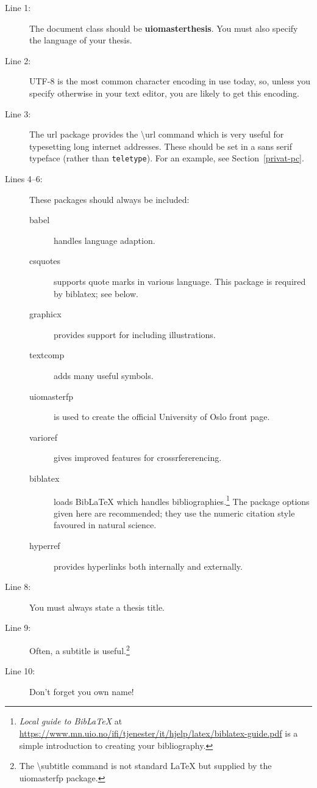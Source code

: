 \documentclass[UKenglish]{uiomasterthesis}
\newcommand{\bsl}{\textbackslash}
\newcommand{\p}[1]{\textsf{#1}}
\newcommand{\pb}[1]{\textbf{\p{#1}}}
\newcommand{\pcmd}[1]{\p{\bsl #1}}
\begin{document}
\begin{description}
\item[Line 1:] The document class should be \pb{uiomasterthesis}. You must
  also specify the language of your thesis.
\item[Line 2:] UTF-8 is the most common character encoding in use
  today, so, unless you specify otherwise in your text editor, you are
  likely to get this encoding.
\item[Line 3:] The \p{url} package provides the \pcmd{url}
  command which is very useful for typesetting long internet
  addresses. These should be set in a \textsf{sans serif} typeface
  (rather than \texttt{teletype}). For an example, see
  Section~\vref{privat-pc}.
\item[Lines 4--6:] These packages should always be included:
  \begin{description}
  \item[\p{babel}] handles language adaption.
  \item[\p{csquotes}] supports quote marks in various language. This
    package is required by \p{biblatex}; see below.
  \item[\p{graphicx}] provides support for including illustrations.
  \item[\p{textcomp}] adds many useful symbols.
  \item[\p{uiomasterfp}] is used to create the official University of
    Oslo front page.
  \item[\p{varioref}] gives improved features for crossrfererencing.
  \item[\p{biblatex}] loads Bib\LaTeX{} which handles
    bibliographies.\footnote{\emph{Local guide to Bib\LaTeX} at
      \url{https://www.mn.uio.no/ifi/tjenester/it/hjelp/latex/biblatex-guide.pdf}
      is a simple introduction to creating your bibliography.}
    The package options given here are recommended; they use the
    numeric citation style favoured in natural science.
  \item[\p{hyperref}] provides hyperlinks both internally and externally.
  \end{description}

\item[Line 8:] You must always state a thesis title.
\item[Line 9:] Often, a subtitle is useful.\footnote{The
  \pcmd{subtitle} command is not standard \LaTeX{} but supplied by the
  \p{uiomasterfp} package.}
\item[Line 10:] Don't forget you own name!


\end{description}
\end{document}
